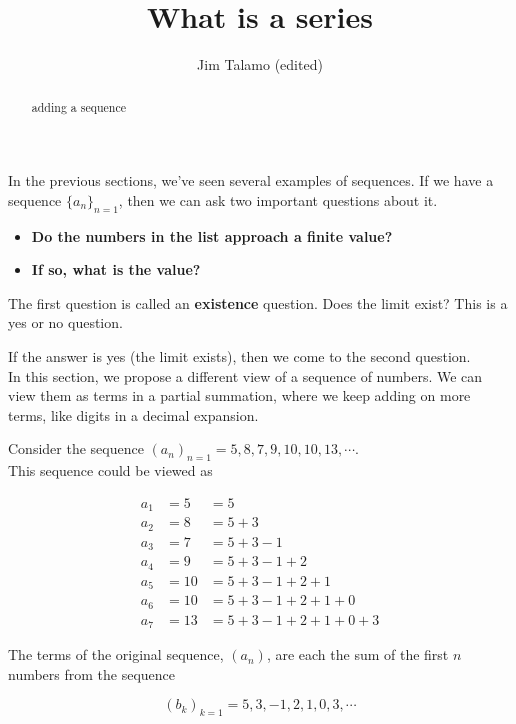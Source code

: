 \documentclass{ximera}
\author{Jim Talamo (edited)}
\title{What is a series}
\begin{document}
\begin{abstract}
adding a sequence
\end{abstract}
\maketitle

In the previous sections, we've seen several examples of sequences.  If we have a sequence $\{a_n\}_{n=1}$, then we can ask two important questions about it.

\begin{itemize}
\item \textbf{\textcolor{purple!85!blue}{Do the numbers in the list approach a finite value?}} 
\item \textbf{\textcolor{purple!85!blue}{If so, what is the value?}} 
\end{itemize}


The first question is called an \textbf{\textcolor{purple!85!blue}{existence}} question.  Does the limit exist?  This is a yes or no question.

If the answer is yes (the limit exists), then we come to the second question. \\


In this section, we propose a different view of a sequence of numbers.  We can view them as terms in a partial summation, where we keep adding on more terms, like digits in a decimal expansion.







\begin{example}


Consider the sequence $(a_n)_{n=1} = 5, 8, 7, 9, 10, 10, 13, \cdots$. \\

This sequence could be viewed as


\begin{align*}
a_1 & = 5  & = 5 \\
a_2 & = 8  & = 5 + 3 \\
a_3 & = 7  & = 5 + 3 - 1 \\
a_4 & = 9  & = 5 + 3 - 1 + 2 \\
a_5 & = 10 & = 5 + 3 - 1 + 2 + 1 \\
a_6 & = 10 & = 5 + 3 - 1 + 2 + 1 + 0 \\
a_7 & = 13 & = 5 + 3 - 1 + 2 + 1 + 0 + 3
\end{align*}


The terms of the original sequence, $(a_n)$, are each the sum of the first $n$ numbers from the sequence 

\[
(b_k)_{k=1} = 5, 3, -1, 2, 1, 0, 3, \cdots
\]





\end{example}
\end{document}
